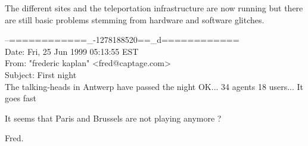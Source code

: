 The different sites and the teleportation infrastructure are now running but there are still basic problems 
stemming from hardware and software glitches. 

\begin{mail}
--============\_-1278188520==\_d============\\
Date: Fri, 25 Jun 1999 05:13:55 EST\\
From: "frederic kaplan" <fred@captage.com>\\
Subject: First night\\

The talking-heads in Antwerp have passed the night OK... 
34 agents
18 users... It goes fast

It seems that Paris and Brussels are not playing anymore ?

Fred.
\end{mail}


